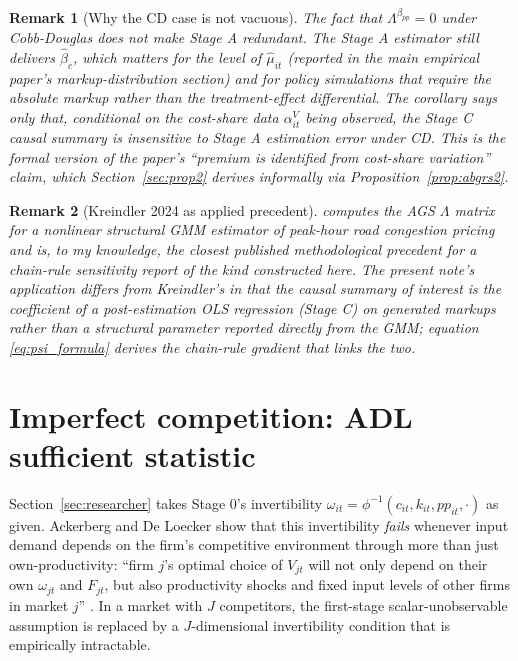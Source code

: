 \documentclass[11pt]{article}
\newtheorem{remark}{Remark}
\begin{document}
\begin{remark}[Why the CD case is not vacuous]\label{rem:cd_not_vacuous}
The fact that $\Lambda^{\beta_{pp}} = 0$ under Cobb-Douglas does not make Stage A redundant. The Stage A estimator still delivers $\hat\beta_c$, which matters for the \emph{level} of $\hat\mu_{it}$ (reported in the main empirical paper's markup-distribution section) and for policy simulations that require the absolute markup rather than the treatment-effect differential. The corollary says only that, \emph{conditional on the cost-share data $\alpha^V_{it}$ being observed}, the Stage C causal summary is insensitive to Stage A estimation error under CD. This is the formal version of the paper's ``premium is identified from cost-share variation'' claim, which Section~\ref{sec:prop2} derives informally via Proposition~\ref{prop:abgrs2}.
\end{remark}

\begin{remark}[Kreindler 2024 as applied precedent]\label{rem:kreindler}
\citet{Kreindler2024} computes the AGS $\Lambda$ matrix for a nonlinear structural GMM estimator of peak-hour road congestion pricing and is, to my knowledge, the closest published methodological precedent for a chain-rule sensitivity report of the kind constructed here. The present note's application differs from Kreindler's in that the causal summary of interest is the coefficient of a post-estimation OLS regression (Stage C) on generated markups rather than a structural parameter reported directly from the GMM; equation \eqref{eq:psi_formula} derives the chain-rule gradient that links the two.
\end{remark}

\section{Imperfect competition: ADL sufficient statistic}\label{sec:adl}

Section~\ref{sec:researcher} takes Stage 0's invertibility $\omega_{it} = \phi^{-1}(c_{it}, k_{it}, pp_{it}, \cdot)$ as given. Ackerberg and De Loecker \cite{ADL2024} show that this invertibility \emph{fails} whenever input demand depends on the firm's competitive environment through more than just own-productivity: ``firm $j$'s optimal choice of $V_{jt}$ will not only depend on their own $\omega_{jt}$ and $F_{jt}$, but also productivity shocks and fixed input levels of other firms in market $j$'' \citep[p.~9]{ADL2024}. In a market with $J$ competitors, the first-stage scalar-unobservable assumption is replaced by a $J$-dimensional invertibility condition that is empirically intractable.
\end{document}
